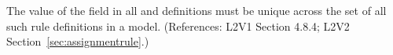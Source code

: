 The value of the  field in all \AssignmentRule and
\RateRule definitions must be unique across the set of all such rule
definitions in a model.  (References: L2V1 Section 4.8.4; L2V2
Section~\ref{sec:assignmentrule}.)
